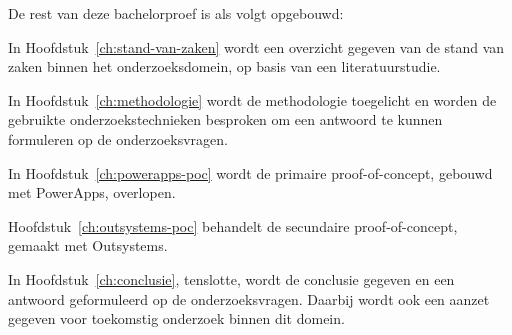 De rest van deze bachelorproef is als volgt opgebouwd:

In Hoofdstuk~\ref{ch:stand-van-zaken} wordt een overzicht gegeven van de stand van zaken binnen het onderzoeksdomein, op basis van een literatuurstudie.

In Hoofdstuk~\ref{ch:methodologie} wordt de methodologie toegelicht en worden de gebruikte onderzoekstechnieken besproken om een antwoord te kunnen formuleren op de onderzoeksvragen.

In Hoofdstuk~\ref{ch:powerapps-poc} wordt de primaire proof-of-concept, gebouwd met PowerApps, overlopen.

Hoofdstuk~\ref{ch:outsystems-poc} behandelt de secundaire proof-of-concept, gemaakt met Outsystems.          

In Hoofdstuk~\ref{ch:conclusie}, tenslotte, wordt de conclusie gegeven en een antwoord geformuleerd op de onderzoeksvragen. Daarbij wordt ook een aanzet gegeven voor toekomstig onderzoek binnen dit domein.